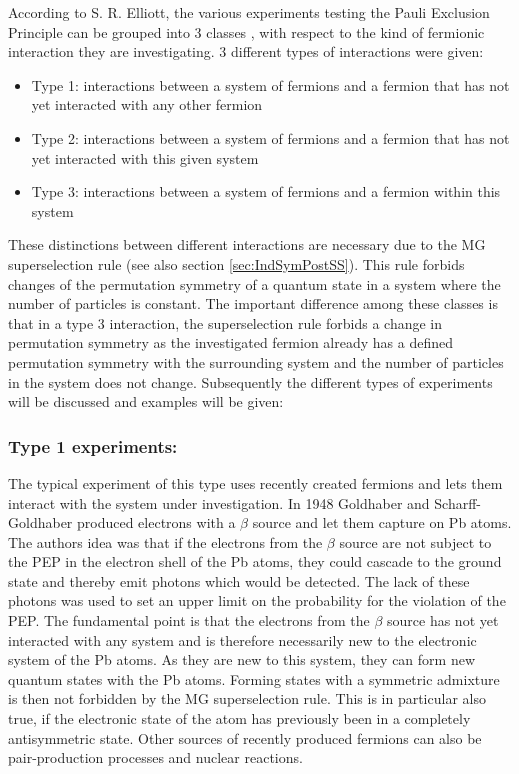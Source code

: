 According to S. R. Elliott, the various experiments testing the Pauli Exclusion Principle can be grouped into 3 classes \cite{Elliott2012}, with respect to the kind of fermionic interaction they are investigating. 3 different types of interactions were given:
\begin{itemize}
 \item Type 1: interactions between a system of fermions and a fermion that has not yet interacted with any other fermion
 \item Type 2: interactions between a system of fermions and a fermion that has not yet interacted with this given system
 \item Type 3: interactions between a system of fermions and a fermion within this system
\end{itemize}
These distinctions between different interactions are necessary due to the MG superselection rule (see also section \ref{sec:IndSymPostSS}). This rule forbids changes of the permutation symmetry of a quantum state in a system where the number of particles is constant. The important difference among these classes is that in a type 3 interaction, the superselection rule forbids a change in permutation symmetry as the investigated fermion already has a defined permutation symmetry with the surrounding system and the number of particles in the system does not change. Subsequently the different types of experiments will be discussed and examples will be given:

\subsubsection{Type 1 experiments:}

The typical experiment of this type uses recently created fermions and lets them interact with the system under investigation. In 1948 Goldhaber and Scharff-Goldhaber \cite{Goldhaber1948} produced electrons with a $\beta$ source and let them capture on Pb atoms. The authors idea was that if the electrons from the $\beta$ source are not subject to the PEP in the electron shell of the Pb atoms, they could cascade to the ground state and thereby emit photons which would be detected. The lack of these photons was used to set an upper limit on the probability for the violation of the PEP. The fundamental point is that the electrons from the $\beta$ source has not yet interacted with any system and is therefore necessarily new to the electronic system of the Pb atoms. As they are new to this system, they can form new quantum states with the Pb atoms. Forming states with a symmetric admixture is then not forbidden by the MG superselection rule. This is in particular also true, if the electronic state of the atom has previously been in a completely antisymmetric state. Other sources of recently produced fermions can also be pair-production processes and nuclear reactions.


